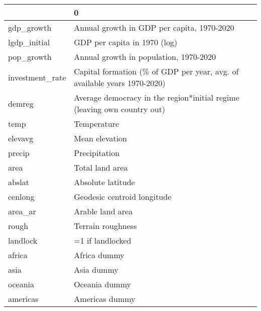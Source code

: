 \begin{tabular}{ll}
\toprule
{} &                                                                         0 \\
\midrule
gdp\_growth      &                                Annual growth in GDP per capita, 1970-2020 \\
lgdp\_initial    &                                              GDP per capita in 1970 (log) \\
pop\_growth      &                                    Annual growth in population, 1970-2020 \\
investment\_rate &  Capital formation (\% of GDP per year, avg. of available years 1970-2020) \\
demreg          &  Average democracy in the region*initial regime (leaving own country out) \\
temp            &                                                               Temperature \\
elevavg         &                                                            Mean elevation \\
precip          &                                                             Precipitation \\
area            &                                                           Total land area \\
abslat          &                                                         Absolute latitude \\
cenlong         &                                               Geodesic centroid longitude \\
area\_ar         &                                                          Arable land area \\
rough           &                                                         Terrain roughness \\
landlock        &                                                          =1 if landlocked \\
africa          &                                                              Africa dummy \\
asia            &                                                                Asia dummy \\
oceania         &                                                             Oceania dummy \\
americas        &                                                            Americas dummy \\

\end{tabular}
